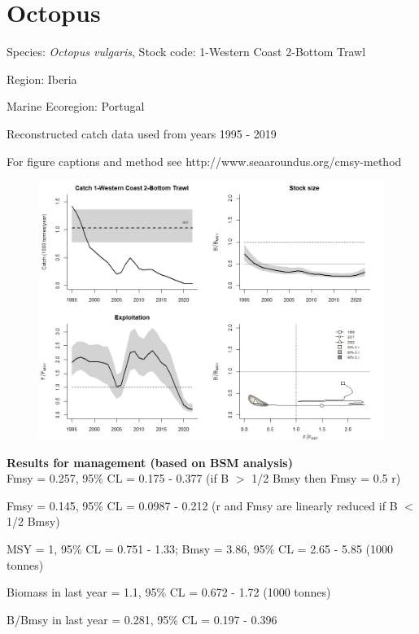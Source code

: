 \documentclass[12pt,a4paper]{article}\usepackage[]{graphicx}\usepackage[]{xcolor}
\begin{document}
    \section*{Octopus}


    Species: \emph{Octopus vulgaris}, Stock code: 1-Western Coast 2-Bottom Trawl

Region: Iberia

Marine Ecoregion: Portugal

Reconstructed catch data used from years 1995 - 2019 

 For figure captions and method see http://www.seaaroundus.org/cmsy-method

    \begin{figure}[ht]
    \centering
    \includegraphics[width=1.00\textwidth ext=.jpg type=jpg]{1-Western Coast 2-Bottom Trawl_MAN.jpg}
    \end{figure}

    \textbf{Results for management (based on BSM analysis)}\\

Fmsy = 0.257, 95\% CL = 0.175 - 0.377 (if B $>$ 1/2 Bmsy then Fmsy = 0.5 r)

Fmsy = 0.145, 95\% CL = 0.0987 - 0.212 (r and Fmsy are linearly reduced if B $<$ 1/2 Bmsy)

MSY = 1,  95\% CL = 0.751 - 1.33; Bmsy = 3.86,  95\% CL = 2.65 - 5.85 (1000 tonnes)

Biomass in last year = 1.1, 95\% CL = 0.672 - 1.72 (1000 tonnes)

B/Bmsy in last year = 0.281, 95\% CL = 0.197 - 0.396
\end{document}
